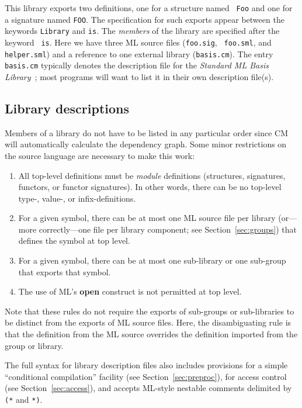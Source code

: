 \documentclass{article}
\begin{document}
This library exports two definitions, one for a structure named {\tt
Foo} and one for a signature named {\tt FOO}.  The specification for
such exports appear between the keywords {\tt Library} and {\tt is}.
The {\em members} of the library are specified after the keyword {\tt
is}.  Here we have three ML source files ({\tt foo.sig}, {\tt
foo.sml}, and {\tt helper.sml}) and a reference to one external
library ({\tt basis.cm}).  The entry {\tt basis.cm} typically denotes
the description file for the {\it Standard ML Basis
Library}~\cite{reppy99:basis}; most programs will want to list it in
their own description file(s).

\subsection{Library descriptions}

Members of a library do not have to be listed in any particular order
since CM will automatically calculate the dependency graph.  Some
minor restrictions on the source language are necessary to make this
work:
\begin{enumerate}
\item All top-level definitions must be {\em module} definitions
(structures, signatures, functors, or functor signatures).  In other
words, there can be no top-level type-, value-, or infix-definitions.
\item For a given symbol, there can be at most one ML source file per
library (or---more correctly---one file per library component; see
Section~\ref{sec:groups}) that defines the symbol at top level.
\item For a given symbol, there can be at most one sub-library or one
sub-group that exports that symbol.
\item The use of ML's {\bf open} construct is not permitted at top
level.
\end{enumerate}

Note that these rules do not require the exports of sub-groups or
sub-libraries to be distinct from the exports of ML source files.
Here, the disambiguating rule is that the definition from the ML
source overrides the definition imported from the group or library.

The full syntax for library description files also includes provisions
for a simple ``conditional compilation'' facility (see
Section~\ref{sec:preproc}), for access control (see
Section~\ref{sec:access}), and accepts ML-style nestable comments
delimited by \verb|(*| and \verb|*)|.
\end{document}
